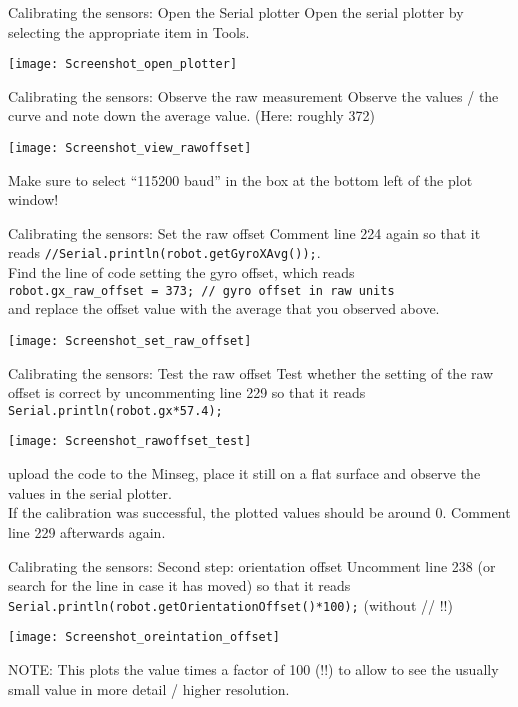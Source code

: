 \begin{frame}{Calibrating the sensors: Open the Serial plotter}
	Open the serial plotter by selecting the appropriate item in Tools.
	\begin{center}
		\texttt{[image: Screenshot\_open\_plotter]}
	\end{center}
\end{frame}

\begin{frame}{Calibrating the sensors: Observe the raw measurement}
	Observe the values / the curve and note down the average value. (Here: roughly 372)
	\begin{center}
		\texttt{[image: Screenshot\_view\_rawoffset]}
	\end{center}
	Make sure to select ``115200 baud'' in the box at the bottom left of the plot window!
\end{frame}

\begin{frame}{Calibrating the sensors: Set the raw offset}
	Comment line 224 again so that it reads \texttt{//Serial.println(robot.getGyroXAvg());}.\\
	Find the line of code setting the gyro offset, which reads\\
	\texttt{robot.gx\_raw\_offset = 373; // gyro offset in raw units}\\
	and replace the offset value with the average that you observed above.
	\begin{center}
		\texttt{[image: Screenshot\_set\_raw\_offset]}
	\end{center}
\end{frame}

\begin{frame}{Calibrating the sensors: Test the raw offset}
	Test whether the setting of the raw offset is correct by uncommenting line 229 so that it reads
	\texttt{Serial.println(robot.gx*57.4);}
	\begin{center}
		\texttt{[image: Screenshot\_rawoffset\_test]}
	\end{center}
	upload the code to the Minseg, place it still on a flat surface and observe the values in the serial plotter.\\
	If the calibration was successful, the plotted values should be around 0. Comment line 229 afterwards again.
\end{frame}

\begin{frame}{Calibrating the sensors: Second step: orientation offset}
	Uncomment line 238 (or search for the line in case it has moved) so that it reads \texttt{Serial.println(robot.getOrientationOffset()*100);} (without // !!)
	\begin{center}
		\texttt{[image: Screenshot\_oreintation\_offset]}
	\end{center}
	NOTE: This plots the value times a factor of 100 (!!) to allow to see the usually small value in more detail / higher resolution.
\end{frame}

